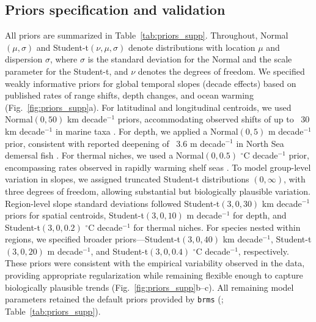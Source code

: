 \documentclass[9pt,twoside,lineno]{pnas-new}
\begin{document}
\subsection*{Priors specification and validation}
All priors are summarized in Table~\ref{tab:priors_supp}. Throughout, Normal$(\mu,\sigma)$ and Student-t$(\nu,\mu,\sigma)$ denote distributions with location $\mu$ and dispersion $\sigma$, where $\sigma$ is the standard deviation for the Normal and the scale parameter for the Student-t, and $\nu$ denotes the degrees of freedom. We specified weakly informative priors for global temporal slopes (decade effects) based on published rates of range shifts, depth changes, and ocean warming (Fig.~\ref{fig:priors_supp}a). For latitudinal and longitudinal centroids, we used Normal$(0,50)$ km decade$^{-1}$ priors, accommodating observed shifts of up to ~30 km decade$^{-1}$ in marine taxa \citep{Poloczanska2013Global}. For depth, we applied a Normal$(0,5)$ m decade$^{-1}$ prior, consistent with reported deepening of ~3.6 m decade$^{-1}$ in North Sea demersal fish \citep{Dulvy2008NorthSea}. For thermal niches, we used a Normal$(0,0.5)$ $^\circ$C decade$^{-1}$ prior, encompassing rates observed in rapidly warming shelf seas \citep{Chen2020SST}.
To model group-level variation in slopes, we assigned truncated Student-t distributions $(0,\infty)$, with three degrees of freedom, allowing substantial but biologically plausible variation. Region-level slope standard deviations followed Student-t$(3,0,30)$ km decade$^{-1}$ priors for spatial centroids, Student-t$(3,0,10)$ m decade$^{-1}$ for depth, and Student-t$(3,0,0.2)$ $^\circ$C decade$^{-1}$ for thermal niches. For species nested within regions, we specified broader priors---Student-t$(3,0,40)$ km decade$^{-1}$, Student-t$(3,0,20)$ m decade$^{-1}$, and Student-t$(3,0,0.4)$ $^\circ$C decade$^{-1}$, respectively.
These priors were consistent with the empirical variability observed in the data, providing appropriate regularization while remaining flexible enough to capture biologically plausible trends (Fig.~\ref{fig:priors_supp}b–c). All remaining model parameters retained the default priors provided by \texttt{brms} (\citep{Burkner2017brms}; Table~\ref{tab:priors_supp}).

\begin{table}[!htbp]
\centering
    \caption{Prior distributions for model parameters. Fixed effects ($\beta$), group-level and standard deviations ($\sigma$), degrees of freedom ($\nu$) for the Student-t distribution, and the correlation matrix of region-level effects ($\mathbf{R}_r$). The source column indicates whether the prior was changed from the default.}
    \label{tab:priors_supp}

\end{table}
\end{document}
